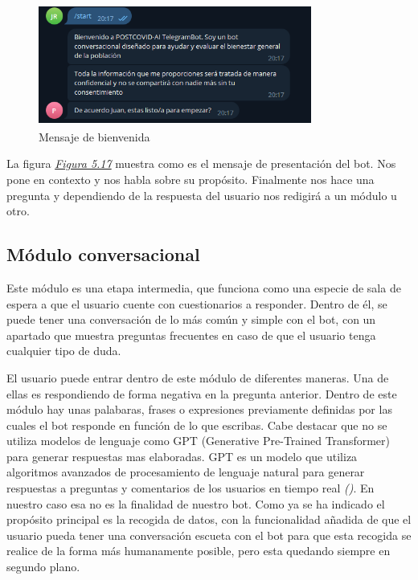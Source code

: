 \begin{figure}[!ht]
    \centering
    \includegraphics[width=0.8\textwidth, height=4cm]{imagenes/welcome.png}
    \caption{ Mensaje de bienvenida }
    \label{fig:welcome}
\end{figure}

La figura \textit{\hyperref[fig:welcome]{Figura 5.17}} muestra como es el mensaje de presentación del bot. Nos pone en contexto y nos habla sobre su propósito. Finalmente nos hace una pregunta y dependiendo de la respuesta del usuario nos redigirá a un módulo u otro. 



\subsection{Módulo conversacional}

Este módulo es una etapa intermedia, que funciona como una especie de sala de espera a que el usuario cuente con cuestionarios a responder. Dentro de él, se puede tener una conversación de lo más común y simple con el bot, con un apartado que muestra preguntas frecuentes en caso de que el usuario tenga cualquier tipo de duda. 

El usuario puede entrar dentro de este módulo de diferentes maneras. Una de ellas es respondiendo de forma negativa en la pregunta anterior. Dentro de este módulo hay unas palabaras, frases o expresiones previamente definidas por las cuales el bot responde en función de lo que escribas. Cabe destacar que no se utiliza modelos de lenguaje como GPT (Generative Pre-Trained Transformer) para generar respuestas mas elaboradas. GPT es un modelo que utiliza algoritmos avanzados de procesamiento de lenguaje natural para generar respuestas a preguntas y comentarios de los usuarios en tiempo real \textit{(\cite{gpt2020})}. En nuestro caso esa no es la finalidad de nuestro bot. Como ya se ha indicado el propósito principal es la recogida de datos, con la funcionalidad añadida de que el usuario pueda tener una conversación escueta con el bot para que esta recogida se realice de la forma más humanamente posible, pero esta quedando siempre en segundo plano. 

